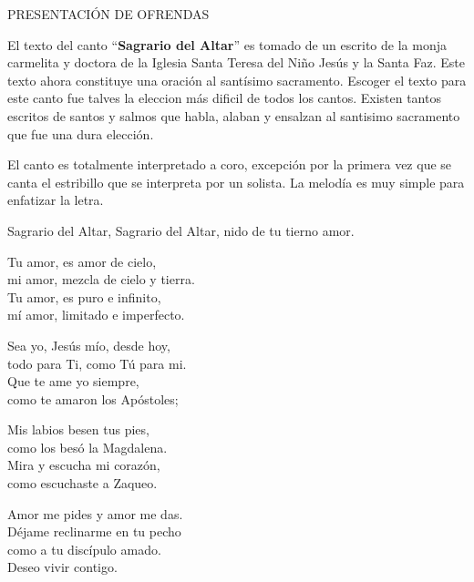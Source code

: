\documentclass[12pt, letterpaper]{report}
\begin{document}


    \begin{center}
      {\large PRESENTACI\'ON DE OFRENDAS}
    \end{center}

    El texto del canto ``\textbf{Sagrario del Altar}'' es tomado de un escrito de la monja carmelita y doctora de la Iglesia Santa Teresa del Ni\~no Jes\'us y la Santa Faz. Este texto ahora constituye una oraci\'on al sant\'isimo sacramento. Escoger el texto para este canto fue talves la eleccion m\'as dificil de todos los cantos. Existen tantos escritos de santos y salmos que habla, alaban y ensalzan al santisimo sacramento que fue una dura elecci\'on.

    El canto es totalmente interpretado a coro, excepci\'on por la primera vez que se canta el estribillo que se interpreta por un solista. La melod\'ia es muy simple para enfatizar la letra.

    \noindent
    Sagrario del Altar, Sagrario del Altar, nido de tu tierno amor.

    \noindent
    Tu amor, es amor de cielo,\\
    mi amor, mezcla de cielo y tierra.\\
    Tu amor, es puro e infinito,\\
    m\'i amor, limitado e imperfecto.

    \noindent
    Sea yo, Jes\'us m\'io, desde hoy,\\
    todo para Ti, como T\'u para mi.\\
    Que te ame yo siempre,\\
    como te amaron los Ap\'ostoles;

    \noindent
    Mis labios besen tus pies,\\
    como los bes\'o la Magdalena.\\
    Mira y escucha mi coraz\'on,\\
    como escuchaste a Zaqueo.

    \noindent
    Amor me pides y amor me das.\\
    D\'ejame reclinarme en tu pecho\\
    como a tu disc\'ipulo amado.\\
    Deseo vivir contigo.
\end{document}
